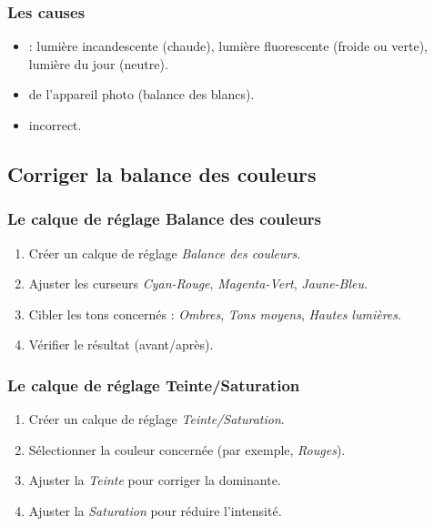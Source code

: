 \subsubsection{Les causes}

\begin{itemize}
    \item {} : lumière incandescente (chaude), lumière fluorescente (froide ou verte), lumière du jour (neutre).
    \item {} de l'appareil photo (balance des blancs).
    \item {} incorrect.
\end{itemize}

\subsection{Corriger la balance des couleurs}

\subsubsection{Le calque de réglage Balance des couleurs}

\begin{enumerate}
    \item Créer un calque de réglage \emph{Balance des couleurs}.
    \item Ajuster les curseurs \emph{Cyan-Rouge}, \emph{Magenta-Vert}, \emph{Jaune-Bleu}.
    \item Cibler les tons concernés : \emph{Ombres}, \emph{Tons moyens}, \emph{Hautes lumières}.
    \item Vérifier le résultat (avant/après).
\end{enumerate}

\subsubsection{Le calque de réglage Teinte/Saturation}

\begin{enumerate}
    \item Créer un calque de réglage \emph{Teinte/Saturation}.
    \item Sélectionner la couleur concernée (par exemple, \emph{Rouges}).
    \item Ajuster la \emph{Teinte} pour corriger la dominante.
    \item Ajuster la \emph{Saturation} pour réduire l'intensité.
\end{enumerate}

